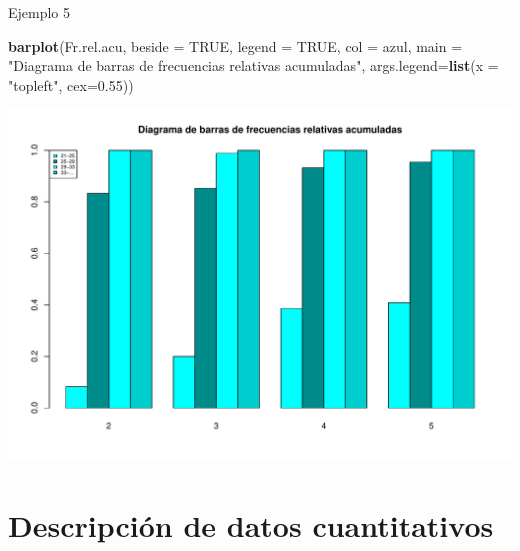 \documentclass[
  ignorenonframetext,
]{beamer}
\newenvironment{Shaded}{\begin{snugshade}}{\end{snugshade}}
\newcommand{\AttributeTok}[1]{\textcolor[rgb]{0.13,0.29,0.53}{#1}}
\newcommand{\ConstantTok}[1]{\textcolor[rgb]{0.56,0.35,0.01}{#1}}
\newcommand{\FloatTok}[1]{\textcolor[rgb]{0.00,0.00,0.81}{#1}}
\newcommand{\FunctionTok}[1]{\textcolor[rgb]{0.13,0.29,0.53}{\textbf{#1}}}
\newcommand{\NormalTok}[1]{#1}
\newcommand{\StringTok}[1]{\textcolor[rgb]{0.31,0.60,0.02}{#1}}
\begin{document}
\begin{frame}[fragile]{Ejemplo 5}
\label{ejemplo-5-17}
\begin{Shaded}
\begin{Highlighting}[]
\FunctionTok{barplot}\NormalTok{(Fr.rel.acu, }\AttributeTok{beside =} \ConstantTok{TRUE}\NormalTok{, }\AttributeTok{legend =} \ConstantTok{TRUE}\NormalTok{, }\AttributeTok{col =}\NormalTok{ azul, }
        \AttributeTok{main =} \StringTok{"Diagrama de barras de frecuencias relativas acumuladas"}\NormalTok{, }
        \AttributeTok{args.legend=}\FunctionTok{list}\NormalTok{(}\AttributeTok{x =} \StringTok{"topleft"}\NormalTok{, }\AttributeTok{cex=}\FloatTok{0.55}\NormalTok{))}
\end{Highlighting}
\end{Shaded}

\includegraphics[width=0.8\linewidth]{R_base_files/figure-beamer/unnamed-chunk-161-1}
\end{frame}

\section{Descripción de datos
cuantitativos}\label{descripciuxf3n-de-datos-cuantitativos}
\end{document}
